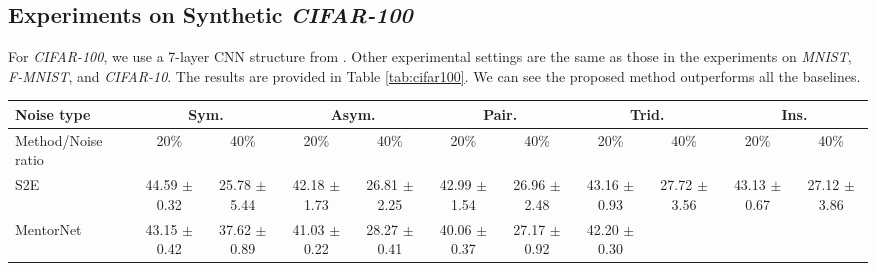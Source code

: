\documentclass[11pt]{article}
\begin{document}
\subsection{Experiments on Synthetic \textit{CIFAR-100}}
For \textit{CIFAR-100}, we use a 7-layer CNN structure from \cite{yu2019does,yao2020searching}. Other experimental settings are the same as those in the experiments on \textit{MNIST}, \textit{F-MNIST}, and \textit{CIFAR-10}. The results are provided in Table \ref{tab:cifar100}. We can see the proposed method outperforms all the baselines.
\begin{table}[!htbp]
    \small
\centering
	\begin{tabular}{l |cc|cc|cc|cc|cc} 
		\Xhline{3\arrayrulewidth}	 	
		   Noise type &\multicolumn{2}{c|}{Sym.}&\multicolumn{2}{c|}{Asym.}&\multicolumn{2}{c|}{Pair.}&\multicolumn{2}{c|}{Trid.}&\multicolumn{2}{c}{Ins.}\\
			\hline
		   Method/Noise ratio&  20\% & 40\%& 20\% & 40\% &20\% & 40\%& 20\% & 40\% & 20\% & 40\%\\
			\hline
			S2E & \makecell{44.59\\ $\pm$\scriptsize{0.32}}
			& \makecell{25.78\\ $\pm$\scriptsize{5.44}}
			& \makecell{42.18\\ $\pm$\scriptsize{1.73}}
			& \makecell{26.81\\ $\pm$\scriptsize{2.25}}
			& \makecell{42.99\\ $\pm$\scriptsize{1.54}}
			& \makecell{26.96\\ $\pm$\scriptsize{2.48}}
			& \makecell{43.16\\ $\pm$\scriptsize{0.93}}
			& \makecell{27.72\\ $\pm$\scriptsize{3.56}}
			& \makecell{43.13\\ $\pm$\scriptsize{0.67}}
			& \makecell{27.12\\ $\pm$\scriptsize{3.86}}\\
			\hline
			MentorNet & \makecell{43.15\\ $\pm$\scriptsize{0.42}}
			& \makecell{37.62\\ $\pm$\scriptsize{0.89}}
			& \makecell{41.03\\ $\pm$\scriptsize{0.22}}
			& \makecell{28.27\\ $\pm$\scriptsize{0.41}}
			& \makecell{40.06\\ $\pm$\scriptsize{0.37}}
			& \makecell{27.17\\ $\pm$\scriptsize{0.92}}
			& \makecell{42.20\\ $\pm$\scriptsize{0.30}}

\end{tabular}
\end{table}
\end{document}
